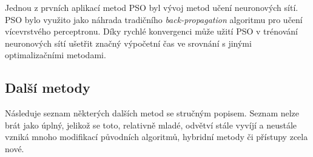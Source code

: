 \documentclass[a4paper,12pt]{article}
\begin{document}
Jednou z prvních aplikací metod PSO byl vývoj metod učení neuronových sítí. PSO bylo využito jako náhrada
tradičního {\it back-propagation} algoritmu pro učení vícevrstvého perceptronu. Díky rychlé konvergenci může
užití PSO v trénování neuronových sítí ušetřit značný výpočetní čas ve srovnání s jinými
optimalizačními metodami.



\subsection{Další metody}
Následuje seznam některých dalších metod se stručným popisem. Seznam nelze brát jako úplný, jelikož se toto, relativně mladé, odvětví stále vyvíjí a neustále vzniká mnoho modifikací původních algoritmů, hybridní metody či
přístupy zcela nové.
\end{document}
